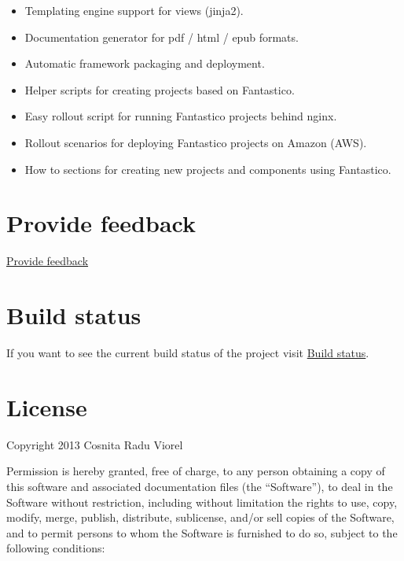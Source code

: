 \documentclass[letterpaper,10pt,english]{sphinxmanual}
\begin{document}
\begin{itemize}
\begin{description}
\begin{itemize}
\item {} 
Templating engine support for views (jinja2).

\item {} 
Documentation generator for pdf / html / epub formats.

\item {} 
Automatic framework packaging and deployment.

\item {} 
Helper scripts for creating projects based on Fantastico.

\item {} 
Easy rollout script for running Fantastico projects behind nginx.

\item {} 
Rollout scenarios for deploying Fantastico projects on Amazon (AWS).

\item {} 
How to sections for creating new projects and components using Fantastico.

\end{itemize}

\end{description}

\end{itemize}


\chapter{Provide feedback}
\label{index:provide-feedback}
\href{https://docs.google.com/forms/d/1tKBopU3lfDB\_w8F4h7Rl1Rn4uydAJq-nha09L\_ptJck/edit?usp=sharing}{Provide feedback}


\chapter{Build status}
\label{index:build-status}
If you want to see the current build status of the project visit \href{http://jenkins.scrum-expert.ro:8080/job/fantastico-framework/badge/icon/}{Build status}.


\chapter{License}
\label{index:license}
Copyright 2013 Cosnita Radu Viorel

Permission is hereby granted, free of charge, to any person obtaining a copy of this software and associated
documentation files (the ``Software''), to deal in the Software without restriction, including without limitation
the rights to use, copy, modify, merge, publish, distribute, sublicense, and/or sell copies of the Software,
and to permit persons to whom the Software is furnished to do so, subject to the following conditions:
\end{document}
